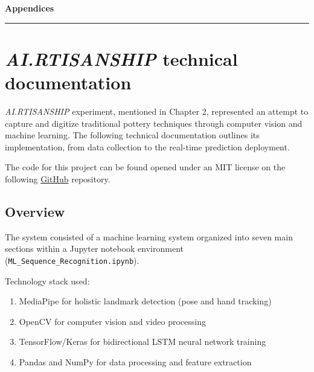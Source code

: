 \clearpage

\setcounter{chapter}{6}
\setcounter{section}{0}


\pagestyle{fancy}
\fancyhf{} 
\fancyfoot[C]{\thepage} 
\renewcommand{\headrulewidth}{0pt}
\renewcommand{\footrulewidth}{0pt}

\noindent
{\Large\textbf{Appendices}}
\vspace{0.3cm}
\hrule
\vspace{0.8cm}
\label{ch:appendices}

\setlength{\parindent}{0pt}

\section{\textit{AI.RTISANSHIP} technical documentation}

\textit{AI.RTISANSHIP} experiment, mentioned in Chapter 2, represented an attempt to capture and digitize traditional pottery techniques through computer vision and machine learning. The following technical documentation outlines its implementation, from data collection to the real-time prediction deployment.

\vspace{0.5cm}

The code for this project can be found opened under an MIT license on the following \href{https://github.com/jmuozan/ML_Sequence_Recognition}{GitHub} repository.

\subsection{Overview}

The system consisted of a machine learning system organized into seven main sections within a Jupyter notebook environment (\texttt{ML\_Sequence\_Recognition.ipynb}).

\vspace{0.5cm}

Technology stack used:
\begin{enumerate}
\item MediaPipe for holistic landmark detection (pose and hand tracking)
\item OpenCV for computer vision and video processing
\item TensorFlow/Keras for bidirectional LSTM neural network training
\item Pandas and NumPy for data processing and feature extraction
\end{enumerate}


